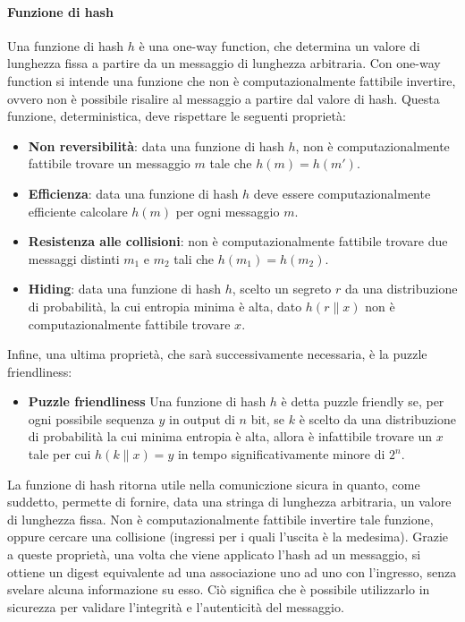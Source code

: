 \documentclass[a4paper,12pt]{article}
\begin{document}
\paragraph{Funzione di hash}
Una funzione di hash $h$ è una one-way function, che determina un valore di lunghezza fissa a partire da un messaggio di lunghezza arbitraria. Con one-way function si intende una funzione che non è computazionalmente fattibile invertire, ovvero non è possibile risalire al messaggio a partire dal valore di hash. 
Questa funzione, deterministica, deve rispettare le seguenti proprietà:
\begin{itemize}
    \item \textbf{Non reversibilità}: data una funzione di hash $h$, non è computazionalmente fattibile trovare un messaggio $m$ tale che $h(m)=h(m')$.
    \item \textbf{Efficienza}: data una funzione di hash $h$ deve essere computazionalmente efficiente calcolare $h(m)$ per ogni messaggio $m$.
    \item \textbf{Resistenza alle collisioni}: non è computazionalmente fattibile trovare due messaggi distinti $m_1$ e $m_2$ tali che $h(m_1)=h(m_2)$.
    \item \textbf{Hiding}: data una funzione di hash $h$, scelto un segreto $r$ da una distribuzione di probabilità, la cui entropia minima è alta, dato $h(r\|x)$ non è computazionalmente fattibile trovare $x$.
\end{itemize}
Infine, una ultima proprietà, che sarà successivamente necessaria, è la puzzle friendliness:
\begin{itemize}
    \item \textbf{Puzzle friendliness} Una funzione di hash $h$ è detta puzzle friendly se, per ogni possibile sequenza $y$ in output di $n$ bit, se $k$ è scelto da una distribuzione di probabilità la cui minima entropia è alta, allora è infattibile trovare un $x$ tale per cui $h(k\|x)=y$ in tempo significativamente minore di $2^n$.
\end{itemize}
La funzione di hash ritorna utile nella comuniczione sicura in quanto, come suddetto, permette di fornire, data una stringa di lunghezza arbitraria, un valore di lunghezza fissa. Non è computazionalmente fattibile invertire tale funzione, oppure cercare una collisione (ingressi per i quali l'uscita è la medesima). Grazie a queste proprietà, una volta che viene applicato l'hash ad un messaggio, si ottiene un digest equivalente ad una associazione uno ad uno con l'ingresso, senza svelare alcuna informazione su esso. Ciò significa che è possibile utilizzarlo in sicurezza per validare l'integrità e l'autenticità del messaggio.
\end{document}
